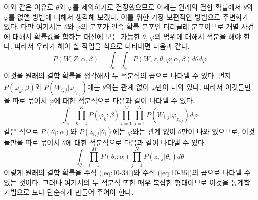 \documentclass[a4paper]{oblivoir}
\begin{document}
이와 같은 이유로 $\theta$와 $\varphi$를 제외하기로 결정했으므로 이제는 원래의 결합 확률에서 $\theta$와 $\varphi$를 없앨 방법에 대해서 생각해 보겠다. 이를 위한 가장 보편적인 방법으로 주변화가 있다. 다만 여기서는 $\theta$와 $\varphi$의 분포가 연속 확률 분포인 디리클레 분포이므로 개별 사건에 대해서 확률값을 합하는 대신에 모든 가능한 $\theta$, $\varphi$의 범위에 대해서 적분을 해야 한다. 따라서 우리가 해야 할 작업을 식으로 나타내면 다음과 같다.   
\begin{equation}
P(W,Z ; \alpha,\beta) = \int_{\theta} \int_{\varphi} P(W,z,\theta,\varphi ; \alpha,\beta) d\theta d\varphi
\label{eq:10-33}
\end{equation}
이것을 원래의 결합 확률을 생각해서 두 적분식의 곱으로 나타낼 수 있다. 먼저 $P(\varphi_k:\beta)$와 $P(W_{i,j}|\varphi_{z_{i,j}})$에는 $\theta$와는 관계 없이 $\varphi$만이 나와 있다. 따라서 이것들만을 따로 묶어서 $\varphi$에 대한 적분식으로 다음과 같이 나타낼 수 있다.     
\begin{equation}
\int_{\varphi} \prod_{k=1}^{K} P(\varphi_k:\beta) \prod_{i=1}^{M} \prod_{j=1}^{N} P(W_{i,j}|\varphi_{z_{i,j}}) d\varphi
\label{eq:10-34}
\end{equation} 
같은 식으로 $P(\theta_i:\alpha)$와 $P(z_{i,j}|\theta_i)$에는 $\varphi$와는 관계 없이 $\theta$만이 나와 있으므로, 이것들만을 따로 묶어서 $\theta$에 대한 적분식으로 다음과 같이 나타낼 수 있다. 
\begin{equation}
\int_{\theta} \prod_{i=1}^{M} P(\theta_i:\alpha) \prod_{j=1}^{N} P(z_{i,j}|\theta_i)  d\theta  
\label{eq:10-35}
\end{equation} 
이렇게 원래의 결합 확률을 수식 (\ref{eq:10-34})와 수식 (\ref{eq:10-35})의 곱으로 나타낼 수 있는 것이다. 그러나 여기서의 두 적분식 또한 매우 복잡한 형태이므로 이것을 통계학 기법으로 보다 단순하게 만들어 주어야 한다. \\
\end{document}
